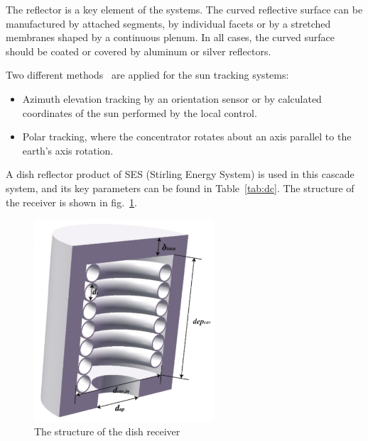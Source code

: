 The reflector is a key element of the systems. The curved reflective surface can be manufactured by attached segments, by individual facets or by a stretched membranes shaped by a continuous plenum. In all cases, the curved surface should be coated or covered by aluminum or silver reflectors. 

Two different methods~\cite{Adkins1987} are applied for the sun tracking systems:
\begin{itemize}
  \item Azimuth elevation tracking by an orientation sensor or by calculated coordinates of the sun performed by the local control.
  \item Polar tracking, where the concentrator rotates about an axis parallel to the earth’s axis rotation.
\end{itemize}

A dish reflector product of SES (Stirling Energy System) is used in this cascade system, and its key parameters can be found in Table~\ref{tab:dc}. The structure of the receiver is shown in fig.~\ref{fig:dishReceiver}.

\begin{figure}[!ht]
\centering
\includegraphics[width=0.6\textwidth]{fig/DishReceiver.pdf}
\caption{The structure of the dish receiver}\label{fig:dishReceiver}
\end{figure}

